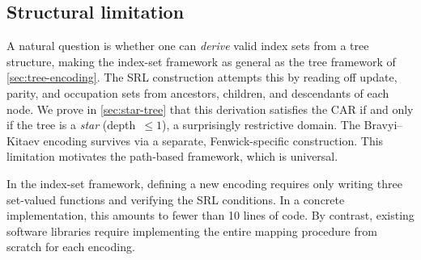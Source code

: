 \subsection{Structural limitation}

A natural question is whether one can \emph{derive} valid index sets
from a tree structure, making the index-set framework as general as the
tree framework of \cref{sec:tree-encoding}.  The SRL construction
attempts this by reading off update, parity, and occupation sets from
ancestors, children, and descendants of each node.  We prove in
\cref{sec:star-tree} that this derivation satisfies the CAR if and only
if the tree is a \emph{star} (depth~$\le 1$), a surprisingly
restrictive domain.  The Bravyi--Kitaev encoding survives via a
separate, Fenwick-specific construction.  This limitation motivates the
path-based framework, which is universal.

\begin{remark}
\label{rem:defining-encoding}
In the index-set framework, defining a new encoding requires only
writing three set-valued functions and verifying the SRL conditions.
In a concrete implementation, this amounts to fewer than 10 lines of
code.  By contrast, existing software libraries require implementing
the entire mapping procedure from scratch for each encoding.
\end{remark}
